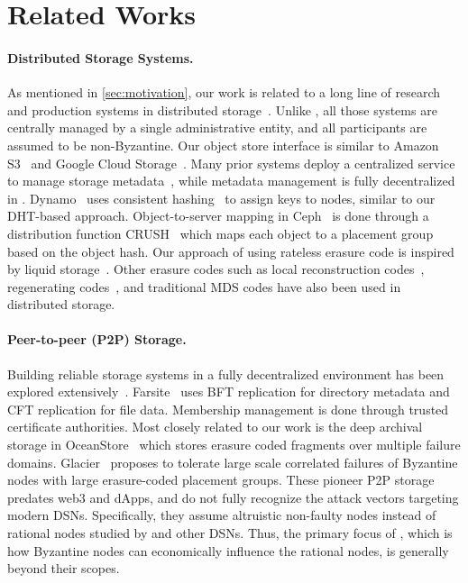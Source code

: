 \section{Related Works}
\label{sec:rel}

\paragraph{Distributed Storage Systems.}
As mentioned in \cref{sec:motivation}, our work is related to a long line of research and production systems in distributed storage~\cite{ceph,gfs,bigtable,dynamo,liquid,amazon-s3,amazon-glacier,google-storage,google-cloudstore,google-coldline}.
Unlike \sys, all those systems are centrally managed by a single administrative entity, and all participants are assumed to be non-Byzantine.
Our object store interface is similar to Amazon S3~\cite{amazon-s3} and Google Cloud Storage~\cite{google-cloudstore}.
Many prior systems deploy a centralized service to manage storage metadata~\cite{gfs,bigtable}, while metadata management is fully decentralized in \sys.
Dynamo~\cite{dynamo} uses consistent hashing~\cite{chash} to assign keys to nodes, similar to our DHT-based approach.
Object-to-server mapping in Ceph~\cite{ceph} is done through a distribution function CRUSH~\cite{crush} which maps each object to a placement group based on the object hash.
\ifspace
Our approach of using rateless erasure code is inspired by liquid storage~\cite{liquid}.
Other erasure codes such as local reconstruction codes~\cite{lrcode}, regenerating codes~\cite{rcode}, and traditional MDS codes have also been used in distributed storage.
\fi

\paragraph{Peer-to-peer (P2P) Storage.}
Building reliable storage systems in a fully decentralized environment has been explored extensively~\cite{xfs,farsite,oceanstore,glacier}.
Farsite~\cite{farsite} uses BFT replication for directory metadata and CFT replication for file data.
Membership management is done through trusted certificate authorities.
Most closely related to our work is the deep archival storage in OceanStore~\cite{oceanstore} which stores erasure coded fragments over multiple failure domains.
Glacier~\cite{glacier} proposes to tolerate large scale correlated failures of Byzantine nodes with large erasure-coded placement groups.
These pioneer P2P storage predates web3 and dApps, and do not fully recognize the attack vectors targeting modern DSNs.
Specifically, they assume altruistic non-faulty nodes instead of rational nodes studied by \sys and other DSNs.
Thus, the primary focus of \sys, which is how Byzantine nodes can economically influence the rational nodes, is generally beyond their scopes.

